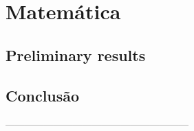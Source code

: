 \documentclass[
	12pt,				%
	openright,			%
	twoside,			%
	a4paper,			%
	english,			%
	]{abntex2}
\begin{document}
\tableofcontents*
\cleardoublepage

\textual



\part{Matemática}

\chapter{Preliminary results}



\chapter{Conclusão}

\postextual
---------------------------------------------------------


%









\printindex
\end{document}
